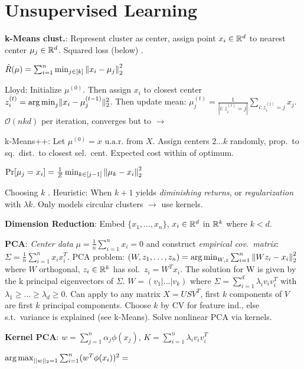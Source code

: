 \section{Unsupervised Learning}

\textbf{k-Means clust.}: Represent cluster as center, assign point $x_i \in \mathbb{R}^d$ to nearest center $\mu_j
\in \mathbb{R}^d$. Squared loss (below) .

$\hat{R}(\mu) = \sum_{i=1}^n \min_{j\in [k]} \left\lVert x_i - \mu_j\right\rVert_2^2$

Lloyd: Initialize $\mu^{(0)}$. Then assign $x_i$ to closest center $z_i^{(t)} =
\operatorname*{arg\,min}_j \lVert x_i - \mu_j^{(t-1)}\rVert_2^2$. Then update mean: $\mu_j^{(t)} =
\frac{1}{|i: z_i^{(t)}=j |} \sum_{i: z_i^{(t)}=j} x_j$. $\mathcal{O}(nkd)$
per iteration, converges  but  to
 $\rightarrow$ 

k-Means++: Let $\mu^{(0)} = \text{$x$ u.a.r.\ from $X$}$. Assign centers
$2\dots k$ randomly, prop.\ to sq.\ dist.\ to closest sel.\ cent. Expected cost
within  of optimum.

$\Pr[\mu_j=x_i]=\frac{1}{Z} \min_{k\in [j-1]} \left\lVert\mu_k-x_i\right\rVert_2^2$

Choosing $k$ . Heuristic: When $k+1$ yields
\emph{diminishing returns}, or \emph{regularization} with $\lambda k$.
Only models circular clusters $\rightarrow$ use kernels.

\textbf{Dimension Reduction}: Embed $\{x_1,\dots,x_n\}$, $x_i \in \mathbb{R}^d$ in $\mathbb{R}^k$ where $k < d$.

\textbf{PCA}: \emph{Center data} $\mu = \frac{1}{n} \sum_{i=1}^n x_i = 0$ and construct
\emph{empirical cov.\ matrix}: $\Sigma = \frac{1}{n} \sum_{i=1}^n x_i x_i^T$.
PCA problem: $(W, z_1,\dots,z_n) = \operatorname*{arg\,min}_{W,z} \sum_{i=1}^n \left\lVert W z_i - x_i\right\rVert_2^2$
where $W$ orthogonal, $z_i \in \mathbb{R}^k$ has sol.\ $z_i = W^T x_i$. The solution for W is given by the k principal eigenvectors of $\Sigma$. $W = (v_1 | ... | v_k)$ where $\Sigma = \sum_{i=1}^d \lambda_i v_i v_i^T$ with $\lambda_1 \geq ... \geq \lambda_d \geq 0$. Can apply to any
matrix $X = U S V^T$, first $k$ components of $V$ are first $k$ principal
components. Choose $k$ by CV for feature ind., else s.t.\ variance is explained
(see k-Means). Solve nonlinear PCA via kernels.

\textbf{Kernel PCA}: $w = \sum_{j=1}^n \alpha_j \phi(x_j)$, $K = \sum_{i=1}^n \lambda_i v_i v_i^T$

$\operatorname*{arg\,max}_{||w||_2 = 1} \sum_{i=1}^n (w^T \phi(x_i))^2 =$

